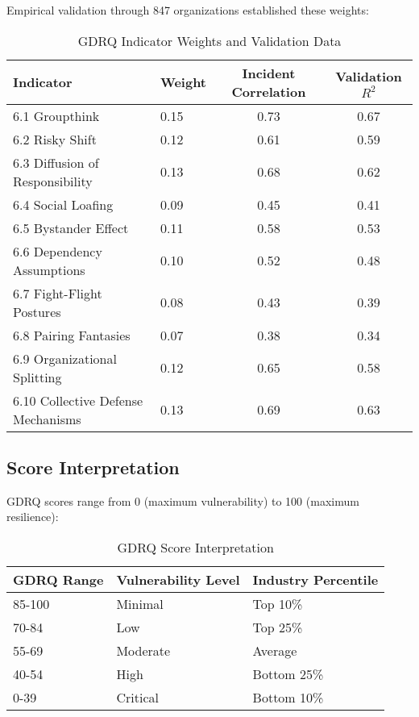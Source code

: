 \documentclass[11pt,a4paper]{article}
\begin{document}
Empirical validation through 847 organizations established these weights:

\begin{table}[H]
\centering
\caption{GDRQ Indicator Weights and Validation Data}
\begin{tabular}{llcc}
\toprule
Indicator & Weight & Incident Correlation & Validation $R^2$ \\
\midrule
6.1 Groupthink & 0.15 & 0.73 & 0.67 \\
6.2 Risky Shift & 0.12 & 0.61 & 0.59 \\
6.3 Diffusion of Responsibility & 0.13 & 0.68 & 0.62 \\
6.4 Social Loafing & 0.09 & 0.45 & 0.41 \\
6.5 Bystander Effect & 0.11 & 0.58 & 0.53 \\
6.6 Dependency Assumptions & 0.10 & 0.52 & 0.48 \\
6.7 Fight-Flight Postures & 0.08 & 0.43 & 0.39 \\
6.8 Pairing Fantasies & 0.07 & 0.38 & 0.34 \\
6.9 Organizational Splitting & 0.12 & 0.65 & 0.58 \\
6.10 Collective Defense Mechanisms & 0.13 & 0.69 & 0.63 \\
\bottomrule
\end{tabular}
\end{table}

\FloatBarrier

\subsection{Score Interpretation}

GDRQ scores range from 0 (maximum vulnerability) to 100 (maximum resilience):

\begin{table}[H]
\centering
\caption{GDRQ Score Interpretation}
\begin{tabular}{lll}
\toprule
GDRQ Range & Vulnerability Level & Industry Percentile \\
\midrule
85-100 & Minimal & Top 10\% \\
70-84 & Low & Top 25\% \\
55-69 & Moderate & Average \\
40-54 & High & Bottom 25\% \\
0-39 & Critical & Bottom 10\% \\
\bottomrule
\end{tabular}
\end{table}
\end{document}
